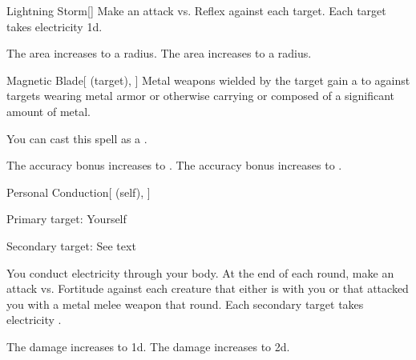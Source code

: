 \lowercase{\hypertarget{spell:Lightning Storm}{}}\label{spell:Lightning Storm}
\begin{freeability}[Rank 3]{\hypertarget{spell:Lightning Storm}{Lightning Storm}}[]
Make an attack vs. Reflex against each target.
\hit Each target takes electricity  \minus1d.

\rankline
{} The area increases to a \arealarge radius.
 The area increases to a \areahuge radius.
\end{freeability}
\vspace{0.25em}



\lowercase{\hypertarget{spell:Magnetic Blade}{}}\label{spell:Magnetic Blade}
\begin{attuneability}[Rank 3]{\hypertarget{spell:Magnetic Blade}{Magnetic Blade}}[ (target), ]
Metal weapons wielded by the target gain a   to  against targets wearing metal armor or otherwise carrying or composed of a significant amount of metal.

You can cast this spell as a .

\rankline
{} The accuracy bonus increases to .
 The accuracy bonus increases to .
\end{attuneability}
\vspace{0.25em}



\lowercase{\hypertarget{spell:Personal Conduction}{}}\label{spell:Personal Conduction}
\begin{attuneability}[Rank 3]{\hypertarget{spell:Personal Conduction}{Personal Conduction}}[ (self), ]

Primary target: Yourself
\par\noindent
Secondary target: See text

You conduct electricity through your body.
At the end of each round, make an attack vs. Fortitude against each creature that either is  with you or that attacked you with a metal melee weapon that round.
\hit Each secondary target takes electricity .

\rankline
{} The damage increases to  \plus1d.
 The damage increases to  \plus2d.
\end{attuneability}
\vspace{0.25em}



